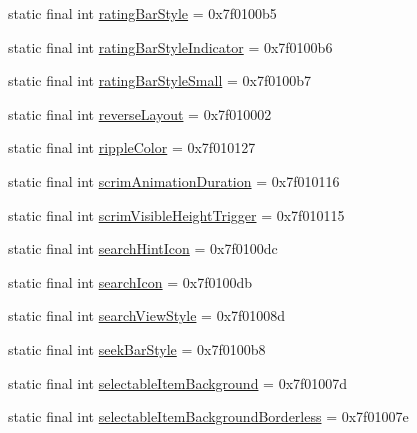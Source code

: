 \begin{CompactItemize}
\item 
static final int \hyperlink{classandroid_1_1support_1_1v7_1_1recyclerview_1_1_r_1_1attr_6b2f1b90c991287690472c620c2a8e02}{ratingBarStyle} = 0x7f0100b5
\item 
static final int \hyperlink{classandroid_1_1support_1_1v7_1_1recyclerview_1_1_r_1_1attr_d6ea89f5bed3179e330ef23e27bcac62}{ratingBarStyleIndicator} = 0x7f0100b6
\item 
static final int \hyperlink{classandroid_1_1support_1_1v7_1_1recyclerview_1_1_r_1_1attr_f39e91b9d8a566b5091e2165fd89397e}{ratingBarStyleSmall} = 0x7f0100b7
\item 
static final int \hyperlink{classandroid_1_1support_1_1v7_1_1recyclerview_1_1_r_1_1attr_b2175d430375ca5880643eac30f325cb}{reverseLayout} = 0x7f010002
\item 
static final int \hyperlink{classandroid_1_1support_1_1v7_1_1recyclerview_1_1_r_1_1attr_aa39993c99447facca3f15bc950aef26}{rippleColor} = 0x7f010127
\item 
static final int \hyperlink{classandroid_1_1support_1_1v7_1_1recyclerview_1_1_r_1_1attr_941cb0201ef764b680799034fb16cfc2}{scrimAnimationDuration} = 0x7f010116
\item 
static final int \hyperlink{classandroid_1_1support_1_1v7_1_1recyclerview_1_1_r_1_1attr_8c2664dd868d9e39b4cc1fd4acba5f94}{scrimVisibleHeightTrigger} = 0x7f010115
\item 
static final int \hyperlink{classandroid_1_1support_1_1v7_1_1recyclerview_1_1_r_1_1attr_92d2d14ffee9571d2333a2aeff21613e}{searchHintIcon} = 0x7f0100dc
\item 
static final int \hyperlink{classandroid_1_1support_1_1v7_1_1recyclerview_1_1_r_1_1attr_f3a7f047197d008315bde8fdda15086f}{searchIcon} = 0x7f0100db
\item 
static final int \hyperlink{classandroid_1_1support_1_1v7_1_1recyclerview_1_1_r_1_1attr_1e3308b912faf5a5d1ce5532cc56663d}{searchViewStyle} = 0x7f01008d
\item 
static final int \hyperlink{classandroid_1_1support_1_1v7_1_1recyclerview_1_1_r_1_1attr_9e1790759a3003c462ca19078b6d4a2e}{seekBarStyle} = 0x7f0100b8
\item 
static final int \hyperlink{classandroid_1_1support_1_1v7_1_1recyclerview_1_1_r_1_1attr_4500d18728d238a4a3869b4920a7b149}{selectableItemBackground} = 0x7f01007d
\item 
static final int \hyperlink{classandroid_1_1support_1_1v7_1_1recyclerview_1_1_r_1_1attr_0904660f8e7b78ebbf95fa230b3e0f2c}{selectableItemBackgroundBorderless} = 0x7f01007e

\end{CompactItemize}
